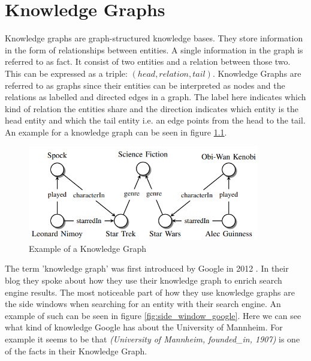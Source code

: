 \chapter{Knowledge Graphs}
\label{cha:knowledge_graphs}

Knowledge graphs are graph-structured knowledge bases. They store information in the form of relationships between entities. A single information in the graph is referred to as fact. It consist of two entities and a relation between those two. This can be expressed as a triple: $(head, relation, tail)$. Knowledge Graphs are referred to as graphs since their entities can be interpreted as nodes and the relations as labelled and directed edges in a graph. The label here indicates which kind of relation the entities share and the direction indicates which entity is the head entity and which the tail entity i.e. an edge points from the head to the tail. An example for a knowledge graph can be seen in figure \ref{fig:example_kg}. \cite{nickel_review_2015}

\begin{figure}[H]
\centering
\includegraphics[width=0.9\textwidth]{images/example_kg.png}
\caption{Example of a Knowledge Graph}
\label{fig:example_kg}
\end{figure}

The term 'knowledge graph' was first introduced by Google in 2012 \cite{singhal_introducing_2012}. In their blog they spoke about how they use their knowledge graph to enrich search engine results. The most noticeable part of how they use knowledge graphs are the side windows when searching for an entity with their search engine. An example of such can be seen in figure \ref{fig:side_window_google}. Here we can see what kind of knowledge Google has about the University of Mannheim. For example it seems to be that \textit{(University of Mannheim, founded\_in, 1907)} is one of the facts in their Knowledge Graph.

